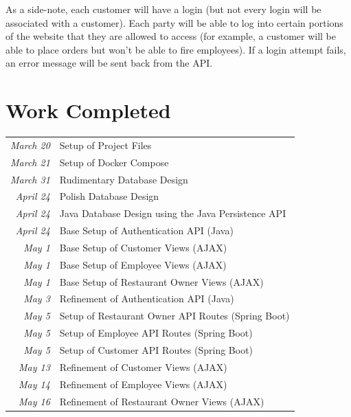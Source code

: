 \documentclass[letterpaper,11pt]{../../templates/texMemo}
\newenvironment{notebox}
{\begin{tcolorbox}[colback=blue!5!white,colframe=blue!75!black,title={\faIcon{info-circle}\hspace{2.5mm}\textbf{Note:}}]}
{\end{tcolorbox}}
\begin{document}
    \begin{notebox}
        As a side-note, each customer will have a login (but not every login will be associated with a customer). Each party will be able to log into certain portions of the website that they are allowed to access (for example, a customer will be able to place orders but won't be able to fire employees). If a login attempt fails, an error message will be sent back from the API.
    \end{notebox}


    \section{Work Completed}
    \begin{tabular}{|r l|}
        \hline
        \emph{March 20} & Setup of Project Files                              \\
        \emph{March 21} & Setup of Docker Compose                             \\
        \hline
        \emph{March 31} & Rudimentary Database Design                         \\
        \emph{April 24} & Polish Database Design                              \\
        \hline
        \emph{April 24} & Java Database Design using the Java Persistence API \\
        \emph{April 24} & Base Setup of Authentication API (Java)             \\
        \hline
        \emph{May 1}    & Base Setup of Customer Views (AJAX)                 \\
        \emph{May 1}    & Base Setup of Employee Views (AJAX)                 \\
        \emph{May 1}    & Base Setup of Restaurant Owner Views (AJAX)         \\
        \hline
        \emph{May 3}    & Refinement of Authentication API (Java)             \\
        \hline
        \emph{May 5}    & Setup of Restaurant Owner API Routes (Spring Boot)  \\
        \emph{May 5}    & Setup of Employee API Routes (Spring Boot)          \\
        \emph{May 5}    & Setup of Customer API Routes (Spring Boot)          \\
        \hline
        \emph{May 13}   & Refinement of Customer Views (AJAX)                 \\
        \emph{May 14}   & Refinement of Employee Views (AJAX)                 \\
        \emph{May 16}   & Refinement of Restaurant Owner Views (AJAX)         \\
        \hline
    \end{tabular}
\end{document}
